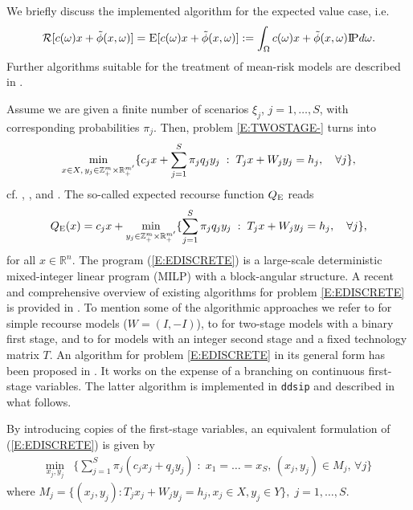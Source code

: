 \documentclass[11pt,draft]{article}
\newcommand{\expect}{{\textsc{E}}} %
\newcommand{\E}{{\expect}} %
\newcommand{\risk}{{\mathcal{R}}} %
\newcommand{\RI}{{\risk}}
\newcommand{\QE}{{Q_\E}}
\newcommand{\+}{{\ti{+}}}
\newcommand{\1}{{\ti{1}}}
\newcommand{\R}{\mathbb{R}}
\newcommand{\Z}{\mathbb{Z}}
\newcommand{\ie}{i.e.\ }
\newcommand{\st}{\;:\;}
\newcommand{\ZtiRp}{{\Z^m_\+ \times \R^{m'}_\+}}
\renewcommand{\P}{{\textsc{I}\!\textsc{P}}}
\begin{document}
We briefly discuss the implemented algorithm for the expected value case, \ie 
$$\RI[c(\omega)x + \tilde \phi(x,\omega)]  = \E[c(\omega)x + \tilde \phi(x,\omega)] := \int_\Omega
c(\omega)x + \tilde \phi(x,\omega) \P d \omega. $$ 
Further algorithms suitable for the treatment of mean-risk models are described in \cite{diss}.

Assume we
are given a finite number of scenarios $\xi_j$, $j=1,\ldots,S$, with corresponding 
probabilities $\pi_j$. Then, problem \eqref{E:TWOSTAGE-} turns into 
%
\begin{equation} \label{E:EDISCRETE}
\min_{x \in X,\,y_j\in \ZtiRp} \{ c_j x + \sum_{j=1}^S \pi_j q_j y_j \st T_jx +W_j y_j = h_j, \quad
\forall j\},  
\end{equation}
%
cf. \cite{bir}, \cite{kal}, and \cite{pre}. The so-called expected recourse function $\QE$ reads
%
\begin{equation*} 
\QE(x)= c_j x + \min_{y_j\in \ZtiRp} \{ \sum_{j=1}^S \pi_j q_j y_j \st T_jx +W_j y_j = h_j, \quad \forall j\},  
\end{equation*}
%
for all $x \in \R^n$.
The program (\ref{E:EDISCRETE}) is a large-scale deterministic mixed-integer linear program (MILP)
with a block-angular 
structure. A recent and comprehensive overview of existing algorithms for problem
\eqref{E:EDISCRETE} is provided in \cite{louv}. To mention some of the algorithmic approaches we refer to 
\cite{vdvl} for simple recourse models ($W=(I,-I)$), to \cite{lapo} for two-stage models
with a binary first stage, and to \cite{ahme} for models with an integer second stage and a fixed
technology matrix $T$. An
algorithm  for problem \eqref{E:EDISCRETE} in its general form has been proposed in \cite{cs1}. It
works on the expense of a branching on continuous first-stage variables. The latter algorithm is
implemented in \texttt{ddsip} and described in what follows.

By introducing copies of the first-stage variables, an equivalent formulation of (\ref{E:EDISCRETE})
is given by  
%
\begin{equation} \label{E:COPIES}
\begin{aligned}
\min_{x_j,y_j}&\{\sum_{j=1}^S \pi_j(c_j x_j+q_j y_j) \st x_1=\ldots=x_S, \, (x_j,y_j) \in M_j,\,\forall j\}
\end{aligned}
\end{equation}
where $M_j=\{(x_j,y_j):T_jx_j+W_j y_j = h_j, x_j \in X, y_j \in Y \},\; j=1,\ldots,S. $
\end{document}
